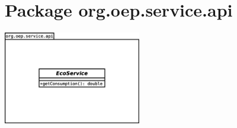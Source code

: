 \documentclass[a4paper, 11pt]{report}
\begin{document}
\section{Package org.oep.service.api}
	\begin{centering}
		\includegraphics[width=0.45\textwidth]{figures/EcoPattern_Service_Api_Classes.eps}
	\end{centering}
\end{document}
